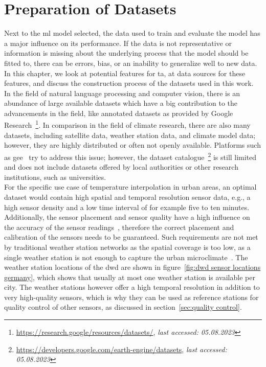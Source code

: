 \chapter{Preparation of Datasets}
\label{chap:preparations data sets}

Next to the \gls{ml} model selected, the data used to train and evaluate the model has a major influence on its performance. If the data is not representative or information is missing about the underlying process that the model should be fitted to, there can be errors, bias, or an inability to generalize well to new data. In this chapter, we look at potential features for \gls{ta}, at data sources for these features, and discuss the construction process of the datasets used in this work.\\
In the field of natural language processing and computer vision, there is an abundance of large available datasets which have a big contribution to the advancements in the field, like annotated datasets as provided by Google Research~\footnote{\url{https://research.google/resources/datasets/}, \textit{last accessed: 05.08.2023}}. In comparison in the field of climate research, there are also many datasets, including satellite data, weather station data, and climate model data; however, they are highly distributed or often not openly available. Platforms such as \gls{gee}~\cite{gorelick2017google} try to address this issue; however, the dataset catalogue~\footnote{\url{https://developers.google.com/earth-engine/datasets}, \textit{last accessed: 05.08.2023}} is still limited and does not include datasets offered by local authorities or other research institutions, such as universities.\\
For the specific use case of temperature interpolation in urban areas, an optimal dataset would contain high spatial and temporal resolution sensor data, e.g., a high sensor density and a low time interval of for example five to ten minutes. Additionally, the sensor placement and sensor quality have a high influence on the accuracy of the sensor readings~\cite{oke2006guideline}, therefore the correct placement and calibration of the sensors needs to be guaranteed. Such requirements are not met by traditional weather station networks as the spatial coverage is too low, as a single weather station is not enough to capture the urban microclimate~\cite{oke2017urban}. The weather station locations of the \gls{dwd} are shown in figure~\ref{fig:dwd sensor locations germany}, which shows that usually at most one weather station is available per city. The weather stations however offer a high temporal resolution in addition to very high-quality sensors, which is why they can be used as reference stations for quality control of other sensors, as discussed in section~\ref{sec:quality control}.\\
